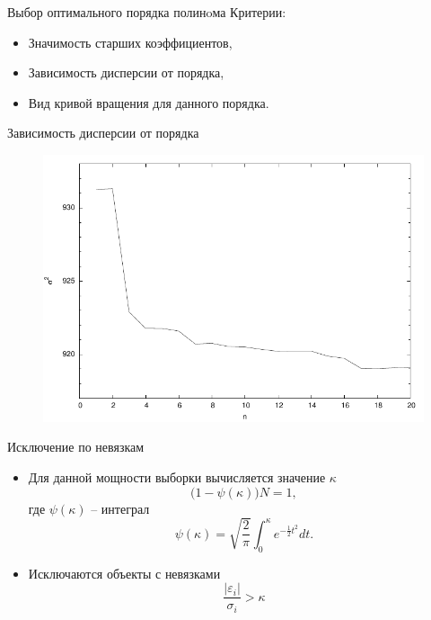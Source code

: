 \documentclass{beamer}
\begin{document}
\begin{frame}{Выбор оптимального порядка полинoма}
	Критерии:
	\begin{itemize}
		\item Значимость старших коэффициентов,
		\item Зависимость дисперсии от порядка,
		\item Вид кривой вращения для данного порядка.
	\end{itemize}
\end{frame}

\begin{frame}{Зависимость дисперсии от порядка}
\begin{figure}[h]
\begin{minipage}[h]{0.8\linewidth}
	\includegraphics[width=1\linewidth]{pdf/sigmas.pdf}
\end{minipage}
\end{figure}
\end{frame}

\begin{frame}{Исключение по невязкам}
	\begin{itemize}
		\item Для данной мощности выборки вычисляется значение $\kappa$
			\begin{equation}
				\big(1 - \psi(\kappa)\big) N = 1,
			\end{equation}
			где $\psi(\kappa)$ -- интеграл
			\begin{equation}
				\psi(\kappa) = \sqrt{\frac{2}{\pi}} \int^{\kappa}_{0} e^{-\frac{1}{2}t^2} dt.
			\end{equation}
		\item Исключаются объекты с невязками
			\begin{equation}
				\frac{| \varepsilon_i |}{\sigma_i} > \kappa
			\end{equation}
	\end{itemize}
	\begin{center}
\end{center}
\end{frame}
\end{document}
